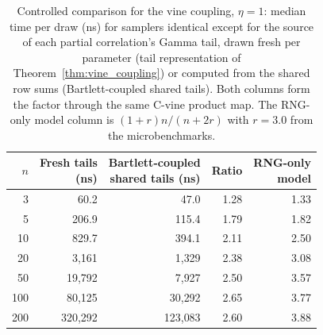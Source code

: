 \documentclass[12pt,english]{article}
\theoremstyle{plain} %
\theoremstyle{definition} %
\theoremstyle{remark} %
\begin{document}
\begin{table}[t]
\centering
\caption{Controlled comparison for the vine coupling, $\eta=1$: median time per draw (ns) for samplers identical except for the source of each partial correlation's Gamma tail, drawn fresh per parameter (tail representation of Theorem~\ref{thm:vine_coupling}) or computed from the shared row sums (Bartlett-coupled shared tails). Both columns form the factor through the same C-vine product map. The RNG-only model column is $(1+r)n/(n+2r)$ with $r=3.0$ from the microbenchmarks.}
\label{tab:controlled_vine_thm}
\begin{tabular}{rrrrr}
\toprule
$n$ & \makecell{Fresh tails\\(ns)} & \makecell{Bartlett-coupled\\shared tails (ns)} & Ratio & \makecell{RNG-only\\model} \\
\midrule
  3 &     60.2 &     47.0 & 1.28 & 1.33 \\
  5 &    206.9 &    115.4 & 1.79 & 1.82 \\
 10 &    829.7 &    394.1 & 2.11 & 2.50 \\
 20 &  3{,}161 &  1{,}329 & 2.38 & 3.08 \\
 50 & 19{,}792 &  7{,}927 & 2.50 & 3.57 \\
100 & 80{,}125 & 30{,}292 & 2.65 & 3.77 \\
200 & 320{,}292 & 123{,}083 & 2.60 & 3.88 \\
\bottomrule
\end{tabular}
\end{table}
\end{document}
